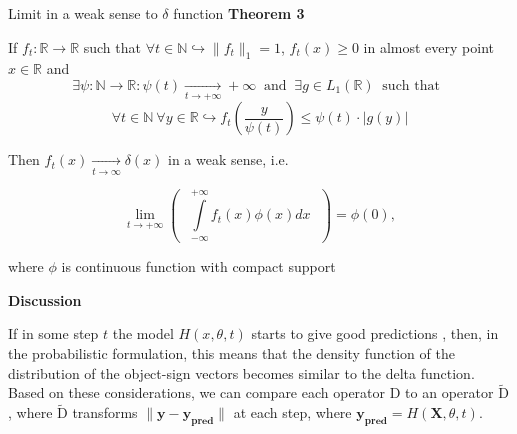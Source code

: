 \documentclass[10pt]{beamer}
\begin{document}
    \begin{frame}{Limit in a weak sense to $\delta$ function}
        \normalsize{\textcolor{myNewColorA}{\textbf{Theorem 3}}}
        \small

        If $f_t : \mathbb{R} \to \mathbb{R}$ such that $\forall t \in \mathbb{N} \hookrightarrow  \|f_t\|_1 = 1$, $f_t(x) \geq 0$ in almost every point $x \in \mathbb{R}$ and
        \begin{equation*}
            \exists \psi : \mathbb{N} \to \mathbb{R} : \psi(t) \underset{t \to +\infty}{\longrightarrow} +\infty ~\text{ and }~
            \exists g \in L_1(\mathbb{R}) ~\text{ such that }~
        \end{equation*}
        \begin{equation*}
            \forall t \in \mathbb{N} ~\forall y \in \mathbb{R} \hookrightarrow f_t\left(\dfrac{y}{\psi(t)}\right) \leq \psi(t) \cdot |g(y)|
        \end{equation*}

        Then $f_t(x) \underset{t \to \infty}{\longrightarrow} \delta(x)$ in a weak sense, i.e.

        \begin{equation*}
            \underset{t \to +\infty}{\lim}\left( \text{ } \int\limits_{-\infty}^{+\infty} f_t(x) \phi(x) dx \text{ } \right) = \phi(0),
        \end{equation*}

        where $\phi$ is continuous function with compact support

        \normalsize{\textcolor{myNewColorA}{\textbf{Discussion}}}
        \small

        If in some step $t$ the model $H(x, \theta, t)$ starts to give good predictions , then, in the probabilistic formulation, this means that the density function of the distribution of the object-sign vectors becomes similar to the delta function. Based on these considerations, we can compare each operator $\text{D}$ to an operator $\widetilde{\text{D}}$, where $\widetilde{\text{D}}$ transforms $\|\mathbf{y} - \mathbf{y_{\text{pred}}}\|$ at each step, where $\mathbf{y_{\text{pred}}} = H(\mathbf{X}, \theta, t)$.
        
    \end{frame}
\end{document}
